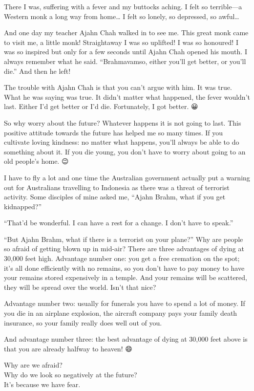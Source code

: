 \documentclass[12pt, openany]{book}
\newenvironment{aphorism}%
{%
\begin{center}\begin{itshape}
}%
{\end{itshape}\end{center}
}%
\begin{document}
There I was, suffering with a fever and my buttocks aching. I felt so terrible—a Western monk a long way from home… I felt so lonely, so depressed, so awful… 

And one day my teacher Ajahn Chah walked in to see me. This great monk came to visit me, a little monk! Straightaway I was so uplifted! I was so honoured! I was so inspired but only for a few seconds until Ajahn Chah opened his mouth. I always remember what he said. “Brahmavamso, either you’ll get better, or you’ll die.” And then he left! 

The trouble with Ajahn Chah is that you can’t argue with him. It was true. What he was saying was true. It didn’t matter what happened, the fever wouldn’t last. Either I’d get better or I’d die. Fortunately, I got better. 😀

So why worry about the future? Whatever happens it is not going to last. This positive attitude towards the future has helped me so many times. If you cultivate loving kindness: no matter what happens, you’ll always be able to do something about it. If you die young, you don’t have to worry about going to an old people’s home. 😉 

I have to fly a lot and one time the Australian government actually put a warning out for Australians travelling to Indonesia as there was a threat of terrorist activity. Some disciples of mine asked me, “Ajahn Brahm, what if you get kidnapped?” 

“That’d be wonderful. I can have a rest for a change. I don’t have to speak.” 

“But Ajahn Brahm, what if there is a terrorist on your plane?” Why are people so afraid of getting blown up in mid-air? There are three advantages of dying at 30,000 feet high. Advantage number one: you get a free cremation on the spot; it’s all done efficiently with no remains, so you don’t have to pay money to have your remains stored expensively in a temple. And your remains will be scattered, they will be spread over the world. Isn’t that nice? 

Advantage number two: usually for funerals you have to spend a lot of money. If you die in an airplane explosion, the aircraft company pays your family death insurance, so your family really does well out of you. 

And advantage number three: the best advantage of dying at 30,000 feet above is that you are already halfway to heaven! 😄 

\begin{aphorism}
Why are we afraid?\\  
Why do we look so negatively at the future?\\ 
It’s because we have fear.
\end{aphorism}
\end{document}
